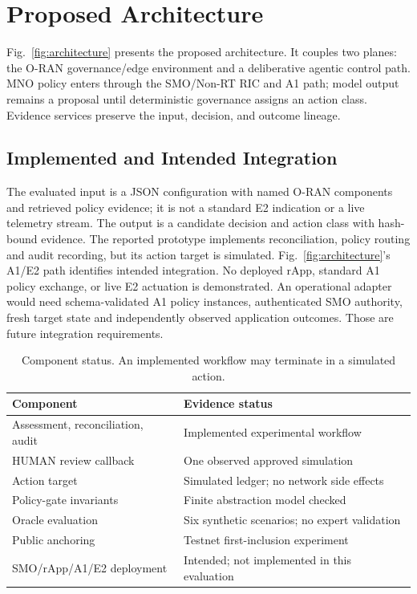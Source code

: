 \documentclass[journal]{IEEEtran}
\newif\ifshowrevisions
\newenvironment{revision}{\begingroup\ifshowrevisions\color{blue}\else\color{black}\fi}{\endgroup}
\newcommand{\rev}[1]{{\ifshowrevisions\color{blue}\else\color{black}\fi #1}}
\begin{document}
\section{Proposed Architecture}
\label{sec:architecture}
Fig.~\ref{fig:architecture} presents the proposed architecture. It couples two
planes: the O-RAN governance/edge environment and a deliberative agentic
control path. MNO policy enters through the SMO/Non-RT RIC and A1 path; model
output remains a proposal until deterministic governance assigns an action
class. Evidence services preserve the input, decision, and outcome lineage.


\begin{revision}
\subsection{Implemented and Intended Integration}
\label{sec:integration-status}
The evaluated input is a JSON configuration with named O-RAN components and
retrieved policy evidence; it is not a standard E2 indication or a live
telemetry stream. The output is a candidate decision and action class with
hash-bound evidence. The reported prototype implements reconciliation,
policy routing and audit recording, but its action target is simulated.
Fig.~\ref{fig:architecture}'s A1/E2 path identifies intended integration.
No deployed rApp, standard A1 policy exchange, or live E2 actuation is
demonstrated. An operational adapter would need schema-validated A1 policy
instances, authenticated SMO authority, fresh target state and independently
observed application outcomes. Those are future integration requirements.
\begin{table}[!t]
\centering\ifshowrevisions\color{blue}\else\color{black}\fi\footnotesize
\caption{\rev{Component status. An implemented workflow may terminate in a simulated action.}}
\label{tab:component-status}
\begin{tabular}{p{}p{}}
\toprule
Component & Evidence status \\
\midrule
Assessment, reconciliation, audit & Implemented experimental workflow \\
HUMAN review callback & One observed approved simulation \\
Action target & Simulated ledger; no network side effects \\
Policy-gate invariants & Finite abstraction model checked \\
Oracle evaluation & Six synthetic scenarios; no expert validation \\
Public anchoring & Testnet first-inclusion experiment \\
SMO/rApp/A1/E2 deployment & Intended; not implemented in this evaluation \\
\bottomrule
\end{tabular}
\end{table}
\end{revision}
\end{document}
